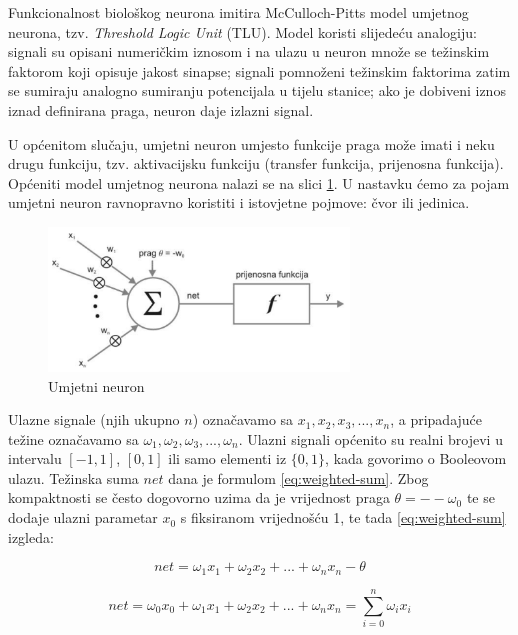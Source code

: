 Funkcionalnost biološkog neurona imitira McCulloch-Pitts model umjetnog neurona, tzv. \textit{Threshold Logic Unit} (TLU). Model koristi slijedeću analogiju: signali su opisani numeričkim iznosom i na ulazu u neuron množe se težinskim faktorom koji opisuje jakost sinapse; signali pomnoženi težinskim faktorima zatim se sumiraju analogno sumiranju potencijala u tijelu stanice; ako je dobiveni iznos iznad definirana praga, neuron daje izlazni signal. 

U općenitom slučaju, umjetni neuron umjesto funkcije praga može imati i neku drugu funkciju, tzv. aktivacijsku funkciju (transfer funkcija, prijenosna funkcija). Općeniti model umjetnog neurona nalazi se na slici \ref{img:artificial-neuron}. U nastavku ćemo za pojam umjetni neuron ravnopravno koristiti i istovjetne pojmove: čvor ili jedinica. 

\begin{figure}[htb]
\centering
\includegraphics[width=8cm]{img/ArtificialNeuron.png}
\caption{Umjetni neuron \citep{cupicZbirka}}
\label{img:artificial-neuron}
\end{figure}

Ulazne signale (njih ukupno $n$) označavamo sa $x_1, x_2, x_3, ... , x_n$, a pripadajuće težine označavamo sa $\omega_1, \omega_2, \omega_3,..., \omega_n$.
Ulazni signali općenito su realni brojevi u intervalu $[-1,1]$, $[0,1]$ ili samo elementi iz $\{0,1\}$, kada govorimo o Booleovom ulazu. Težinska suma $net$ dana je formulom \ref{eq:weighted-sum}. Zbog kompaktnosti se često dogovorno uzima da je vrijednost praga $\theta = --\omega_0$ te se dodaje ulazni parametar $x_0$ s fiksiranom vrijednošću 1, te tada \ref{eq:weighted-sum} izgleda:

\begin{equation}
net = \omega_1 x_1 + \omega_2 x_2 + ... + \omega_n x_n - \theta
\label{eq:weighted-sum}
\end{equation}

\begin{equation}
net = \omega_0 x_0 + \omega_1 x_1 + \omega_2 x_2 + ... + \omega_n x_n = \sum_{i=0}^{n} \omega_i x_i
\label{eq:weighted-sum_2}
\end{equation}

